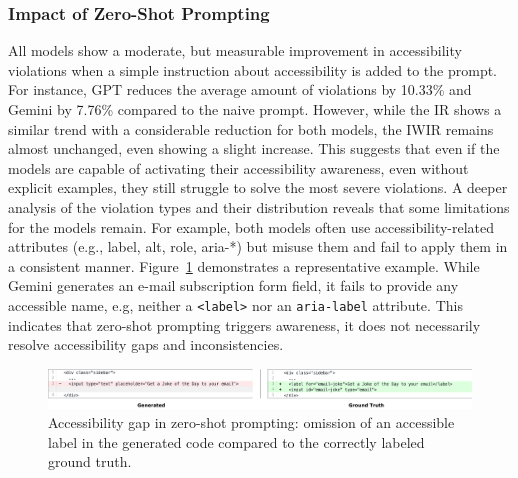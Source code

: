 \begingroup
    
\endgroup

\subsubsection{Impact of Zero-Shot Prompting}
All models show a moderate, but measurable improvement in accessibility 
violations when a simple instruction about accessibility is added to 
the prompt. For instance, GPT reduces the average amount of 
violations by 10.33\% and Gemini by 7.76\% compared to the 
naive prompt. However, while the IR shows a similar trend with 
a considerable reduction for both models, the IWIR remains almost 
unchanged, even showing a slight increase. This suggests that even 
if the models are capable of activating their accessibility 
awareness, even without explicit examples, they still struggle to 
solve the most severe violations.\newline
A deeper analysis of the violation types and their distribution 
reveals that some limitations for the models remain. For example,
both models often use accessibility-related attributes (e.g., 
label, alt, role, aria-*) but misuse them and fail to apply them 
in a consistent manner. Figure~\ref{fig:zero-shot-example} demonstrates
a representative example. While Gemini generates an e-mail 
subscription form field, it fails to provide any accessible name,
e.g, neither a \texttt{<label>} nor an \texttt{aria-label} attribute.
This indicates that zero-shot prompting triggers awareness, it 
does not necessarily resolve accessibility gaps and inconsistencies.

\enlargethispage{2\baselineskip}

\begin{figure}[htbp]
  \centering
  \includegraphics[width=1\linewidth]{figures/zeroshot-example.png}
  \caption{Accessibility gap in zero-shot prompting: omission of an accessible label in the generated code compared to the correctly labeled ground truth.}
  \label{fig:zero-shot-example} 
\end{figure}

